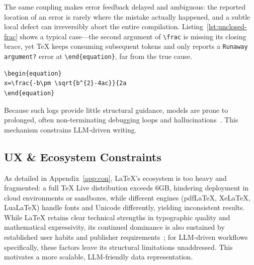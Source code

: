 The same coupling makes error feedback delayed and ambiguous: the reported location of an error is rarely where the mistake actually happened, and a subtle local defect can irreversibly abort the entire compilation. Listing~\ref{lst:unclosed-frac} shows a typical case---the second argument of \verb|\frac| is missing its closing brace, yet {\TeX} keeps consuming subsequent tokens and only reports a \texttt{Runaway argument?} error at \verb|\end{equation}|, far from the true cause.

\begin{lstlisting}[caption={Unclosed brace: error reported at \texttt{\textbackslash end\{equation\}}, not at its source},label={lst:unclosed-frac}]
\begin{equation}
x=\frac{-b\pm \sqrt{b^{2}-4ac}}{2a
\end{equation}
\end{lstlisting}

Because such logs provide little structural guidance, models are prone to prolonged, often non-terminating debugging loops and hallucinations~\cite{jain2026bibby}. This mechanism constrains LLM-driven writing.

\subsection{UX \& Ecosystem Constraints}

As detailed in Appendix~\ref{app:con}, {\LaTeX}'s ecosystem is too heavy and fragmented: a full TeX Live distribution exceeds 6GB, hindering deployment in cloud environments or sandboxes, while different engines (pdfLaTeX, XeLaTeX, LuaLaTeX) handle fonts and Unicode differently, yielding inconsistent results. While {\LaTeX} retains clear technical strengths in typographic quality and mathematical expressivity, its continued dominance is also sustained by established user habits and publisher requirements~\cite{van_der_hoeven_jolly_2020}; for LLM-driven workflows specifically, these factors leave its structural limitations unaddressed. This motivates a more scalable, LLM-friendly data representation.